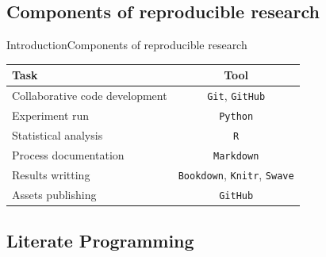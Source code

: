 \documentclass{beamer}
\begin{document}
\subsection{Components of reproducible research}

\begin{frame}{Introduction}{Components of reproducible research}
	\begin{table}
	\centering
	\begin{tabular}{|l|c|}\hline
	\textbf{Task} & \textbf{Tool} \\ \hline
	Collaborative code development & \texttt{Git}, \texttt{GitHub}  \\ \hline
	Experiment run & \texttt{Python}   \\ \hline
	Statistical analysis  & \texttt{R}   \\ \hline
	Process documentation & \texttt{Markdown}   \\ \hline
	Results writting	& \texttt{Bookdown}, \texttt{Knitr}, \texttt{Swave} \\ \hline
	Assets publishing & \texttt{GitHub}\\ \hline

	\end{tabular}
	\end{table}
\end{frame}




\subsection[Literate Programming]{Literate Programming}
\end{document}
